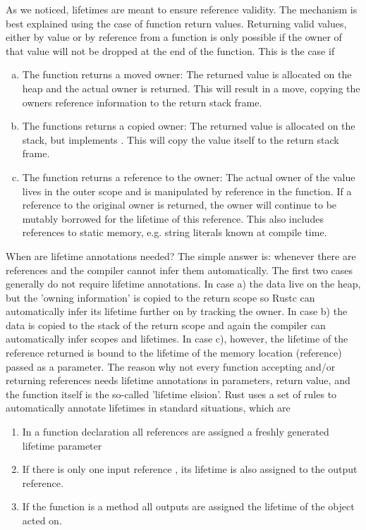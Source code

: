 As we noticed, lifetimes are meant to ensure reference validity. The mechanism is best explained using the case of function return values. Returning valid values, either by value or by reference from a function is only possible if the owner of that value will not be dropped at the end of the function. This is the case if 
\begin{enumerate}[a)]
    \item The function returns a moved owner: The returned value is allocated on the heap and the actual owner is returned. This will result in a move, copying the owners reference information to the return stack frame.
    \item The functions returns a copied owner: The returned value is allocated on the stack, but implements . This will copy the value itself to the return stack frame.
    \item The function returns a reference to the owner: The actual owner of the value lives in the outer scope and is manipulated by reference in the function. If a reference to the original owner is returned, the owner will continue to be mutably borrowed for the lifetime of this reference. This also includes references to static memory, e.g. string literals known at compile time. 
\end{enumerate}

When are lifetime annotations needed? The simple answer is: whenever there are references and the compiler cannot infer them automatically. The first two cases generally do not require lifetime annotations. In case a) the data live on the heap, but the 'owning information' is copied to the return scope so Rustc can automatically infer its lifetime further on by tracking the owner. In case b) the data is copied to the stack of the return scope and again the compiler can automatically infer scopes and lifetimes. In case c), however, the lifetime of the reference returned is bound to the lifetime of the memory location (reference) passed as a parameter. The reason why not every function accepting and/or returning references needs lifetime annotations in parameters, return value, and the function itself is the so-called 'lifetime elision'. Rust uses a set of rules to automatically annotate lifetimes in standard situations, which are
\begin{enumerate}
    \item In a function declaration  all references are assigned a freshly generated lifetime parameter 
    \item If there is only one input reference , its lifetime is also assigned to the output reference.
    \item If the function is a method  all outputs are assigned the lifetime of the object acted on.
\end{enumerate}

